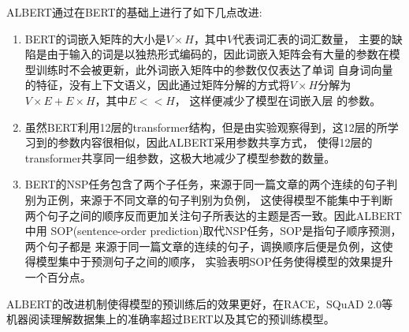 

ALBERT通过在BERT的基础上进行了如下几点改进:
\begin{enumerate}
    \item BERT的词嵌入矩阵的大小是$V\times H$，其中$V$代表词汇表的词汇数量，
    主要的缺陷是由于输入的词是以独热形式编码的，因此词嵌入矩阵会有大量的参数在模型训练时不会被更新，此外词嵌入矩阵中的参数仅仅表达了单词
    自身词向量的特征，没有上下文语义，因此通过矩阵分解的方式将$V\times H$分解为$V\times E+E\times H$，其中$E<<H$，
    这样便减少了模型在词嵌入层
    的参数。
    \item 虽然BERT利用12层的transformer结构，但是由实验观察得到，这12层的所学习到的参数内容很相似，因此ALBERT采用参数共享方式，
    使得12层的transformer共享同一组参数，这极大地减少了模型参数的数量。
    \item BERT的NSP任务包含了两个子任务，来源于同一篇文章的两个连续的句子判别为正例，来源于不同文章的句子判别为负例，
    这使得模型不能集中于判断两个句子之间的顺序反而更加关注句子所表达的主题是否一致。因此ALBERT中用
    SOP(sentence-order prediction)取代NSP任务，SOP是指句子顺序预测，两个句子都是
    来源于同一篇文章的连续的句子，调换顺序后便是负例，这使得模型集中于预测句子之间的顺序，
    实验表明SOP任务使得模型的效果提升一个百分点。
\end{enumerate}
ALBERT的改进机制使得模型的预训练后的效果更好，在RACE，SQuAD 2.0等
机器阅读理解数据集上的准确率超过BERT以及其它的预训练模型。

